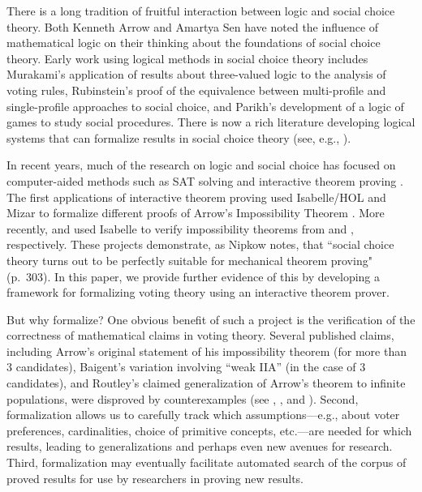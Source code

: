 \documentclass[runningheads]{llncs}
\begin{document}
There is a long tradition of fruitful interaction between logic and social choice theory.  Both Kenneth Arrow \cite[p.~154]{Arrow2014}  and Amartya Sen \cite[p.~108]{Sen2017} have noted the influence of mathematical logic on their thinking about the foundations of social choice theory.  Early work using logical methods in social choice theory includes  Murakami's  \cite{Murakami1968}  application of  results about three-valued logic to the analysis of voting rules, Rubinstein's \cite{Rubinstein1984}  proof of the equivalence between multi-profile and single-profile approaches to social choice, and Parikh's \cite{Parikh1985} development of a logic of games to study social procedures.  There is now a rich literature developing logical systems that can formalize results in social choice theory (see, e.g., \cite{Pauly2008,AgotnesVanDerHoekWooldridge2009,Nipkow2009,Tang2011,TroquardVanDerHoekWooldridge2011,Endriss2011,GrandiEndriss2013,CinaEndriss2016,PacuitYang2016,HollidayPacuit2020}). 

In recent years, much of the research on logic and social choice has focused on computer-aided methods such as SAT solving and interactive theorem proving \cite{Geist2017}.  The first applications of interactive theorem proving used Isabelle/HOL  \cite{Nipkow2009} and Mizar \cite{Wiedijk2007} to formalize different proofs of  Arrow's Impossibility Theorem \cite{Geanakoplos2005}.  More recently, \cite{Brandt2018b} and \cite{Eberl2019} used Isabelle to verify impossibility theorems from \cite{Brandt2018} and \cite{Brandl2018}, respectively.  These projects demonstrate, as Nipkow \cite{Nipkow2009} notes,  that ``social choice theory turns out to be perfectly suitable for mechanical theorem proving" (p.~303).  In this paper, we provide further evidence of this by developing a framework for formalizing voting theory using an interactive theorem prover. 

But why formalize? One obvious benefit of such a project is the verification of the correctness of mathematical claims in voting theory. Several published claims, including Arrow's \cite{Arrow1951} original statement of his impossibility theorem (for more than 3 candidates), Baigent's \cite{Baigent1987} variation involving ``weak IIA'' (in the case of 3 candidates), and Routley's \cite{Routley1979} claimed generalization of Arrow's theorem to infinite populations, were disproved by counterexamples (see \cite{Blau1957}, \cite{Campbell2000}, and \cite{Blau1979}). Second, formalization allows us to carefully track  which assumptions---e.g., about voter preferences, cardinalities, choice of primitive concepts, etc.---are needed for which results, leading to generalizations and perhaps even new avenues for research. Third, formalization may eventually facilitate automated search of the corpus of proved results for use by researchers in proving new results.
\end{document}
